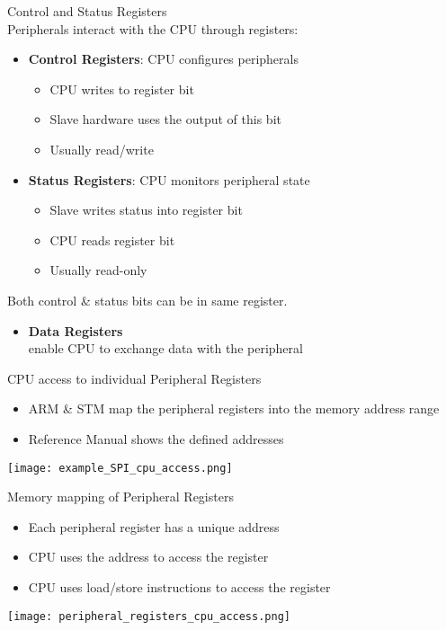 \begin{concept}{Control and Status Registers}\\
Peripherals interact with the CPU through registers:
\begin{itemize}
    \item \textbf{Control Registers}: CPU configures peripherals
    \begin{itemize}
        \item CPU writes to register bit
        \item Slave hardware uses the output of this bit
        \item Usually read/write
    \end{itemize}
    \item \textbf{Status Registers}: CPU monitors peripheral state
    \begin{itemize}
        \item Slave writes status into register bit
        \item CPU reads register bit
        \item Usually read-only
    \end{itemize}
\end{itemize}
Both control \& status bits can be in same register.
\begin{itemize}
    \item \textbf{Data Registers} \\
        enable CPU to exchange data with the peripheral
\end{itemize}
\end{concept}

\raggedcolumns
\multend

\begin{concept}{CPU access to individual Peripheral Registers}
    \begin{itemize}
        \item ARM \& STM map the peripheral registers into
        the memory address range
        \item Reference Manual shows the defined addresses
    \end{itemize}
    \vspace{2mm}
    \texttt{[image: example\_SPI\_cpu\_access.png]}
\end{concept}


\begin{definition}{Memory mapping of Peripheral Registers}
    \begin{itemize}
        \item Each peripheral register has a unique address
        \item CPU uses the address to access the register
        \item CPU uses load/store instructions to access the register
    \end{itemize}
    \texttt{[image: peripheral\_registers\_cpu\_access.png]}
\end{definition}

